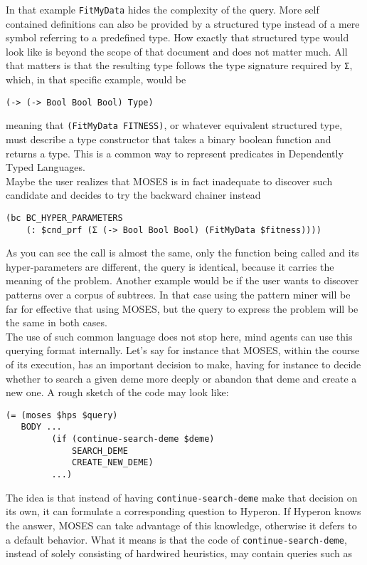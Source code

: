 \documentclass[]{report}
\begin{document}
In that example \texttt{FitMyData} hides the complexity of
the query.  More self contained definitions can also be provided by a
structured type instead of a mere symbol referring to a predefined
type.  How exactly that structured type would look like is beyond the
scope of that document and does not matter much.  All that matters is
that the resulting type follows the type signature required by
\texttt{Σ}, which, in that specific example, would be

\begin{verbatim}
(-> (-> Bool Bool Bool) Type)
\end{verbatim}
meaning that \texttt{(FitMyData FITNESS)}, or whatever
equivalent structured type, must describe a type constructor that
takes a binary boolean function and returns a type.  This is a common
way to represent predicates in Dependently Typed Languages.\\

Maybe the user realizes that MOSES is in fact inadequate to discover
such candidate and decides to try the backward chainer instead

\begin{verbatim}
(bc BC_HYPER_PARAMETERS
    (: $cnd_prf (Σ (-> Bool Bool Bool) (FitMyData $fitness))))
\end{verbatim}
As you can see the call is almost the same, only the function being
called and its hyper-parameters are different, the query is identical,
because it carries the meaning of the problem.  Another example would
be if the user wants to discover patterns over a corpus of subtrees.
In that case using the pattern miner will be far for effective that
using MOSES, but the query to express the problem will be the same in
both cases.\\

The use of such common language does not stop here, mind agents can
use this querying format internally.  Let's say for instance that
MOSES, within the course of its execution, has an important decision
to make, having for instance to decide whether to search a given deme
more deeply or abandon that deme and create a new one.  A rough sketch
of the code may look like:

\begin{verbatim}
(= (moses $hps $query)
   BODY ...
         (if (continue-search-deme $deme)
             SEARCH_DEME
             CREATE_NEW_DEME)
         ...)
\end{verbatim}
The idea is that instead of having
\texttt{continue-search-deme} make that decision on its
own, it can formulate a corresponding question to Hyperon.  If Hyperon
knows the answer, MOSES can take advantage of this knowledge,
otherwise it defers to a default behavior.  What it means is that the
code of \texttt{continue-search-deme}, instead of solely
consisting of hardwired heuristics, may contain queries such as
\end{document}
